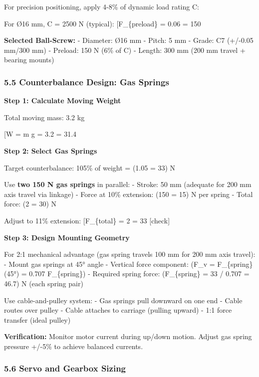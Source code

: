 \documentclass[
]{article}
\begin{document}
For precision positioning, apply 4-8\% of dynamic load rating C:

For Ø16 mm, C = 2500 N (typical): {[}F\_\{preload\} = 0.06  =
150 \text{ N}{]}

\textbf{Selected Ball-Screw:} - Diameter: Ø16 mm - Pitch: 5 mm - Grade:
C7 (+/-0.05 mm/300 mm) - Preload: 150 N (6\% of C) - Length: 300 mm (200
mm travel + bearing mounts)

\subsubsection{5.5 Counterbalance Design: Gas
Springs}\label{counterbalance-design-gas-springs}

\textbf{Step 1: Calculate Moving Weight}

Total moving mass: 3.2 kg

{[}W = m g = 3.2  = 31.4 \text{ N}{]}

\textbf{Step 2: Select Gas Springs}

Target counterbalance: 105\% of weight = (1.05  = 33) N

Use \textbf{two 150 N gas springs} in parallel: - Stroke: 50 mm
(adequate for 200 mm axis travel via linkage) - Force at 10\% extension:
(150  = 15) N per spring - Total force: (2  = 30) N

Adjust to 11\% extension: {[}F\_\{total\} = 2   =
33 \text{ N}{]} {[}check{]}

\textbf{Step 3: Design Mounting Geometry}

For 2:1 mechanical advantage (gas spring travels 100 mm for 200 mm axis
travel): - Mount gas springs at 45° angle - Vertical force component:
(F\_v = F\_\{spring\} \times \sin(45°) = 0.707 F\_\{spring\}) - Required
spring force: (F\_\{spring\} = 33 / 0.707 = 46.7) N (each spring pair)

Use cable-and-pulley system: - Gas springs pull downward on one end -
Cable routes over pulley - Cable attaches to carriage (pulling upward) -
1:1 force transfer (ideal pulley)

\textbf{Verification:} Monitor motor current during up/down motion.
Adjust gas spring pressure +/-5\% to achieve balanced currents.

\subsubsection{5.6 Servo and Gearbox
Sizing}\label{servo-and-gearbox-sizing}
\end{document}

